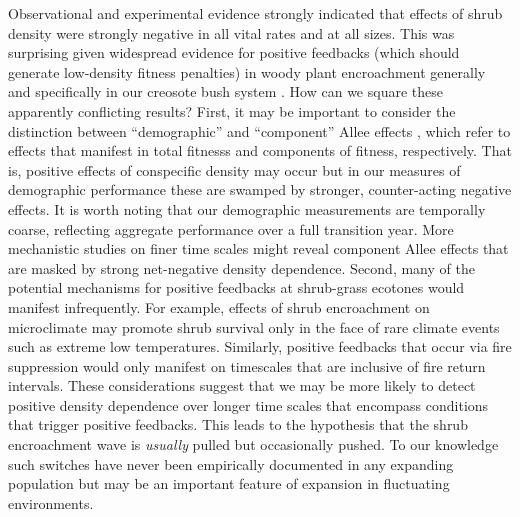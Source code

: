 \documentclass[11pt]{article}\usepackage[]{graphicx}\usepackage[usenames,dvipsnames]{xcolor}
\begin{document}
Observational and experimental evidence strongly indicated that effects of shrub density were strongly negative in all vital rates and at all sizes.
This was surprising given widespread evidence for positive feedbacks (which should generate low-density fitness penalties) in woody plant encroachment generally \citep{d2013vegetation} and specifically in our creosote bush system \citep{d2010positive}. 
How can we square these apparently conflicting results?
First, it may be important to consider the distinction between ``demographic'' and ``component'' Allee effects \citep{stephens1999allee}, which refer to effects that manifest in total fitnesss and components of fitness, respectively. 
That is, positive effects of conspecific density may occur but in our measures of demographic performance these are swamped by stronger, counter-acting negative effects.
It is worth noting that our demographic measurements are temporally coarse, reflecting aggregate performance over a full transition year.
More mechanistic studies on finer time scales might reveal component Allee effects that are masked by strong net-negative density dependence. 
Second, many of the potential mechanisms for positive feedbacks at shrub-grass ecotones would manifest infrequently. 
For example, effects of shrub encroachment on microclimate \citep{d2013vegetation} may promote shrub survival only in the face of rare climate events such as extreme low temperatures.
Similarly, positive feedbacks that occur via fire suppression \citep{ratajczak2011positive,collins2021fire} would only manifest on timescales that are inclusive of fire return intervals. 
These considerations suggest that we may be more likely to detect positive density dependence over longer time scales that encompass conditions that trigger positive feedbacks. 
This leads to the hypothesis that the shrub encroachment wave is \emph{usually} pulled but occasionally pushed.
To our knowledge such switches have never been empirically documented in any expanding population but may be an important feature of expansion in fluctuating environments. 
\end{document}
